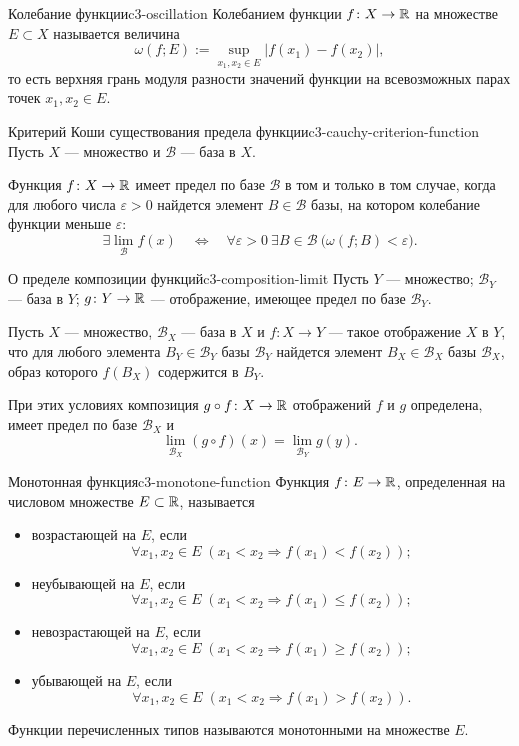 \begin{definition}{Колебание функции}{c3-oscillation}
  Колебанием функции $f\colon X\to\mathbb{R}$ на множестве $E\subset X$
  называется величина
  \[
    \omega(f;E):=\sup_{x_1,x_2\in E}|f(x_1)-f(x_2)|,
  \]
  то есть верхняя грань модуля разности значений функции на всевозможных
  парах точек $x_1,x_2\in E$.
\end{definition}

\begin{theorem}{Критерий Коши существования предела функции}{c3-cauchy-criterion-function}
  Пусть $X$ — множество и $\mathcal B$ — база в $X$.

  Функция $f\colon X\to\mathbb{R}$ имеет предел по базе $\mathcal B$ в том и только
  в том случае, когда для любого числа $\varepsilon>0$ найдется элемент
  $B\in\mathcal B$ базы, на котором колебание функции меньше
  $\varepsilon$:
  \[
    \exists\lim_{\mathcal B}f(x)
    \quad\Longleftrightarrow\quad
    \forall\varepsilon>0\ \exists B\in\mathcal B\
    \bigl(\omega(f;B)<\varepsilon\bigr).
  \]
\end{theorem}

\begin{theorem}{О пределе композиции функций}{c3-composition-limit}
  Пусть $Y$ — множество; $\mathcal B_Y$ — база в $Y$;
  $g\colon Y\to\mathbb{R}$ — отображение, имеющее предел по базе
  $\mathcal B_Y$.

  Пусть $X$ — множество, $\mathcal B_X$ — база в $X$ и
  $f\colon X\to Y$ — такое отображение $X$ в $Y$, что для любого элемента
  $B_Y\in\mathcal B_Y$ базы $\mathcal B_Y$ найдется элемент
  $B_X\in\mathcal B_X$ базы $\mathcal B_X$, образ которого $f(B_X)$
  содержится в $B_Y$.

  При этих условиях композиция $g\circ f\colon X\to\mathbb{R}$ отображений $f$ и
  $g$ определена, имеет предел по базе $\mathcal B_X$ и
  \[
    \lim_{\mathcal B_X}(g\circ f)(x)=\lim_{\mathcal B_Y}g(y).
  \]
\end{theorem}

\begin{definition}{Монотонная функция}{c3-monotone-function}
  Функция $f\colon E\to\mathbb{R}$, определенная на числовом множестве
  $E\subset\mathbb{R}$, называется
  \begin{itemize}
    \item возрастающей на $E$, если
      \[
        \forall x_1,x_2\in E\;(x_1<x_2\Rightarrow f(x_1)<f(x_2));
      \]
    \item неубывающей на $E$, если
      \[
        \forall x_1,x_2\in E\;(x_1<x_2\Rightarrow f(x_1)\le f(x_2));
      \]
    \item невозрастающей на $E$, если
      \[
        \forall x_1,x_2\in E\;(x_1<x_2\Rightarrow f(x_1)\ge f(x_2));
      \]
    \item убывающей на $E$, если
      \[
        \forall x_1,x_2\in E\;(x_1<x_2\Rightarrow f(x_1)>f(x_2)).
      \]
  \end{itemize}
  Функции перечисленных типов называются монотонными на множестве $E$.
\end{definition}

